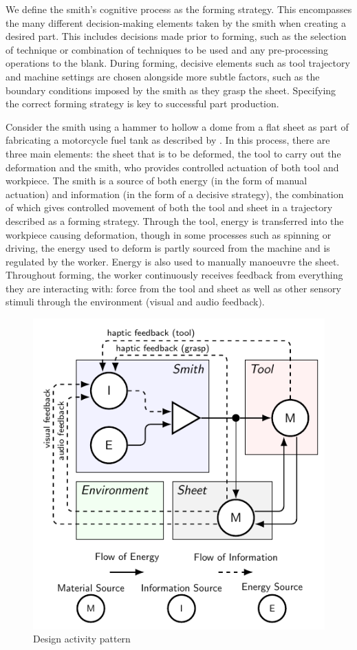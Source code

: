 We define the smith’s cognitive process as the forming strategy. This encompasses the many different decision-making elements taken by the smith when creating a desired part. This includes decisions made prior to forming, such as the selection of technique or combination of techniques to be used and any pre-processing operations to the blank. During forming, decisive elements such as tool trajectory and machine settings are chosen alongside more subtle factors, such as the boundary conditions imposed by the smith as they grasp the sheet. Specifying the correct forming strategy is key to successful part production.  

Consider the smith using a hammer to hollow a dome from a flat sheet as part of fabricating a motorcycle fuel tank as described by \cite{Barr2013ProfessionalFabrication}. In this process, there are three main elements: the sheet that is to be deformed, the tool to carry out the deformation and the smith, who provides controlled actuation of both tool and workpiece. The smith is a source of both energy (in the form of manual actuation) and information (in the form of a decisive strategy), the combination of which gives controlled movement of both the tool and sheet in a trajectory described as a forming strategy. Through the tool, energy is transferred into the workpiece causing deformation, though in some processes such as spinning or driving, the energy used to deform is partly sourced from the machine and is regulated by the worker. Energy is also used to manually manoeuvre the sheet. Throughout forming, the worker continuously receives feedback from everything they are interacting with: force from the tool and sheet as well as other sensory stimuli through the environment (visual and audio feedback). 

\begin{figure}[h]
  \centering
  \includegraphics[width=0.5\linewidth]{Diagrams/DAP4.pdf}  
  \caption{Design activity pattern}
  \label{fig:DAP}
\end{figure}

